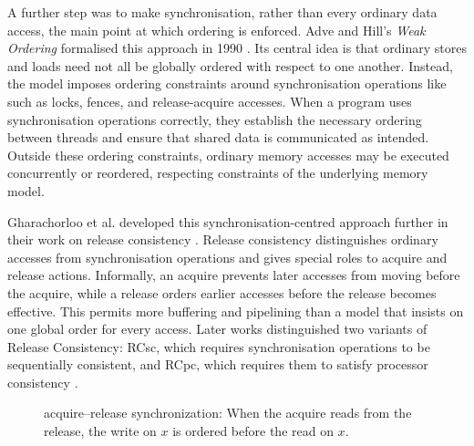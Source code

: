 A further step was to make synchronisation, rather than every ordinary data access, the main point at which ordering is enforced. Adve and Hill's \emph{Weak Ordering} formalised this approach in 1990 \cite{adve1990}. Its central idea is that ordinary stores and loads need not all be globally ordered with respect to one another. Instead, the model imposes ordering constraints around synchronisation operations like such as locks, fences, and release-acquire accesses. When a program uses synchronisation operations correctly, they establish the necessary ordering between threads and ensure that shared data is communicated as intended. Outside these ordering constraints, ordinary memory accesses may be executed concurrently or reordered, respecting constraints of the underlying memory model.

Gharachorloo et al. developed this synchronisation-centred approach further in their work on release consistency \cite{gharachorloo1990memory}.  Release consistency distinguishes ordinary accesses from synchronisation operations and gives special roles to acquire and release actions. Informally, an acquire prevents later accesses from moving before the acquire, while a release orders earlier accesses before the release becomes effective. This permits more buffering and pipelining than a model that insists on one global order for every access. Later  works distinguished two variants of Release Consistency: RCsc, which requires synchronisation operations to be sequentially consistent, and RCpc, which requires them to satisfy processor consistency \cite{GHARACHORLOO1992399}.

\begin{figure}[ht]
\centering
{}
\caption{acquire--release synchronization: When the acquire reads from the release, the write on $x$ is ordered before the read on $x$.}
\label{fig:intro-acquire-release}
\end{figure}

